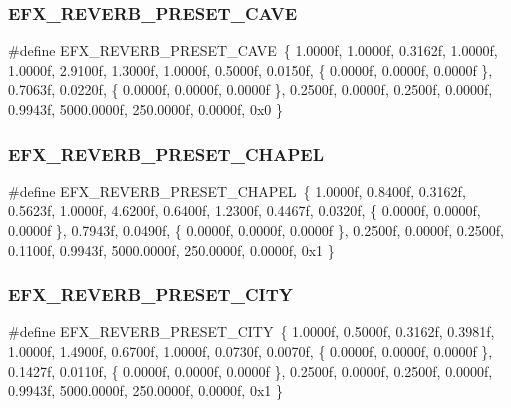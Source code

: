 \subsubsection{\texorpdfstring{E\+F\+X\+\_\+\+R\+E\+V\+E\+R\+B\+\_\+\+P\+R\+E\+S\+E\+T\+\_\+\+C\+A\+VE}{EFX\_REVERB\_PRESET\_CAVE}}
{\footnotesize\ttfamily \#define E\+F\+X\+\_\+\+R\+E\+V\+E\+R\+B\+\_\+\+P\+R\+E\+S\+E\+T\+\_\+\+C\+A\+VE~\{ 1.\+0000f, 1.\+0000f, 0.\+3162f, 1.\+0000f, 1.\+0000f, 2.\+9100f, 1.\+3000f, 1.\+0000f, 0.\+5000f, 0.\+0150f, \{ 0.\+0000f, 0.\+0000f, 0.\+0000f \}, 0.\+7063f, 0.\+0220f, \{ 0.\+0000f, 0.\+0000f, 0.\+0000f \}, 0.\+2500f, 0.\+0000f, 0.\+2500f, 0.\+0000f, 0.\+9943f, 5000.\+0000f, 250.\+0000f, 0.\+0000f, 0x0 \}}

\mbox{\label{efx-presets_8h_a60e9065d8955c7c33095c82587f815f0}} 
\subsubsection{\texorpdfstring{E\+F\+X\+\_\+\+R\+E\+V\+E\+R\+B\+\_\+\+P\+R\+E\+S\+E\+T\+\_\+\+C\+H\+A\+P\+EL}{EFX\_REVERB\_PRESET\_CHAPEL}}
{\footnotesize\ttfamily \#define E\+F\+X\+\_\+\+R\+E\+V\+E\+R\+B\+\_\+\+P\+R\+E\+S\+E\+T\+\_\+\+C\+H\+A\+P\+EL~\{ 1.\+0000f, 0.\+8400f, 0.\+3162f, 0.\+5623f, 1.\+0000f, 4.\+6200f, 0.\+6400f, 1.\+2300f, 0.\+4467f, 0.\+0320f, \{ 0.\+0000f, 0.\+0000f, 0.\+0000f \}, 0.\+7943f, 0.\+0490f, \{ 0.\+0000f, 0.\+0000f, 0.\+0000f \}, 0.\+2500f, 0.\+0000f, 0.\+2500f, 0.\+1100f, 0.\+9943f, 5000.\+0000f, 250.\+0000f, 0.\+0000f, 0x1 \}}

\mbox{\label{efx-presets_8h_acc2f97a2e86723624bff8abd909ddc0c}} 
\subsubsection{\texorpdfstring{E\+F\+X\+\_\+\+R\+E\+V\+E\+R\+B\+\_\+\+P\+R\+E\+S\+E\+T\+\_\+\+C\+I\+TY}{EFX\_REVERB\_PRESET\_CITY}}
{\footnotesize\ttfamily \#define E\+F\+X\+\_\+\+R\+E\+V\+E\+R\+B\+\_\+\+P\+R\+E\+S\+E\+T\+\_\+\+C\+I\+TY~\{ 1.\+0000f, 0.\+5000f, 0.\+3162f, 0.\+3981f, 1.\+0000f, 1.\+4900f, 0.\+6700f, 1.\+0000f, 0.\+0730f, 0.\+0070f, \{ 0.\+0000f, 0.\+0000f, 0.\+0000f \}, 0.\+1427f, 0.\+0110f, \{ 0.\+0000f, 0.\+0000f, 0.\+0000f \}, 0.\+2500f, 0.\+0000f, 0.\+2500f, 0.\+0000f, 0.\+9943f, 5000.\+0000f, 250.\+0000f, 0.\+0000f, 0x1 \}}

